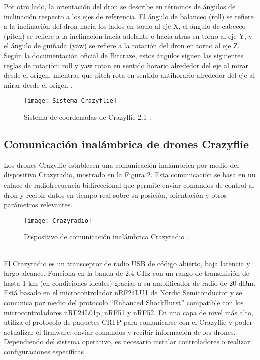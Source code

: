 Por otro lado, la orientación del dron se describe en términos de ángulos de inclinación respecto a los ejes de referencia. El ángulo de balanceo (roll) se refiere a la inclinación del dron hacia los lados en torno al eje X, el ángulo de cabeceo (pitch) se refiere a la inclinación hacia adelante o hacia atrás en torno al eje Y, y el ángulo de guiñada (yaw) se refiere a la rotación del dron en torno al eje Z. Según la documentación oficial de Bitcraze, estos ángulos siguen las siguientes reglas de rotación: roll y yaw rotan en sentido horario alrededor del eje al mirar desde el origen, mientras que pitch rota en sentido antihorario alrededor del eje al mirar desde el origen \cite{Sistema_Crazyflie}.

\begin{figure}[htbp]
	\centering
	\texttt{[image: Sistema\_Crazyflie]}
	\caption{Sistema de coordenadas de Crazyflie 2.1 \cite{Sistema_Crazyflie}.}
	\label{fig:Sistema_Crazyflie}
\end{figure}

\subsection*{Comunicación inalámbrica de drones Crazyflie}
Los drones Crazyflie establecen una comunicación inalámbrica por medio del dispositivo Crazyradio, mostrado en la Figura \ref{fig:Crazyradio}. Esta comunicación se basa en un enlace de radiofrecuencia bidireccional que permite enviar comandos de control al dron y recibir datos en tiempo real sobre su posición, orientación y otros parámetros relevantes.   
\begin{figure}[htbp]
	\centering
	\texttt{[image: Crazyradio]}
	\caption{Dispositivo de comunicación inalámbrica Crazyradio \cite{Crazyradio}.}
	\label{fig:Crazyradio}
\end{figure}
\\ El Crazyradio es un transceptor de radio USB de código abierto, baja latencia y largo alcance. Funciona en la banda de 2.4 GHz con un rango de transmisión de hasta 1 km (en condiciones ideales) gracias a su amplificador de radio de 20 dBm. Está basado en el microcontrolador nRF24LU1 de Nordic Semiconductor y se comunica por medio del protocolo “Enhanced ShockBurst” compatible con los microcontroladores nRF24L01p, nRF51 y nRF52. En una capa de nivel más alto, utiliza el protocolo de paquetes CRTP para comunicarse con el Crazyflie y poder actualizar el firmware, enviar comandos y recibir información de los drones. Dependiendo del sistema operativo, es necesario instalar controladores o realizar configuraciones específicas \cite{Crazyradio}.

